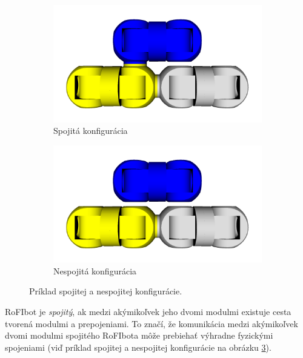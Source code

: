\documentclass[
  printed, %
  oneside, %
  notable,   %
  nolof,     %
  nolot,     %
]{fithesis3}
\begin{document}
\begin{figure}[hbt!]
    \centering
    \begin{subfigure}[b]{0.49\textwidth}
        \includegraphics[width=\textwidth]{pictures/connected_rofibot.png}
        \caption[Spojitá konfigurácia.]{Spojitá konfigurácia}
        \label{fig:connectCfg}
    \end{subfigure}
    \begin{subfigure}[b]{0.49\textwidth}
        \includegraphics[width=\textwidth]{pictures/disconnected_rofibot.png}
        \caption[Nespojitá konfigurácia.]{Nespojitá konfigurácia}
        \label{fig:disconnectCfg}
    \end{subfigure}
    \caption[Príklad konfigurácie]{Príklad spojitej a nespojitej konfigurácie.}
    \label{fig:exampleCfg}
\end{figure}

RoFIbot je \textit{spojitý}, ak medzi akýmikoľvek jeho dvomi modulmi existuje cesta tvorená modulmi a prepojeniami. To značí, že komunikácia medzi akýmikoľvek dvomi modulmi spojitého RoFIbota môže prebiehať výhradne fyzickými spojeniami (viď príklad spojitej a nespojitej konfigurácie na obrázku \ref{fig:exampleCfg}). 
\end{document}

